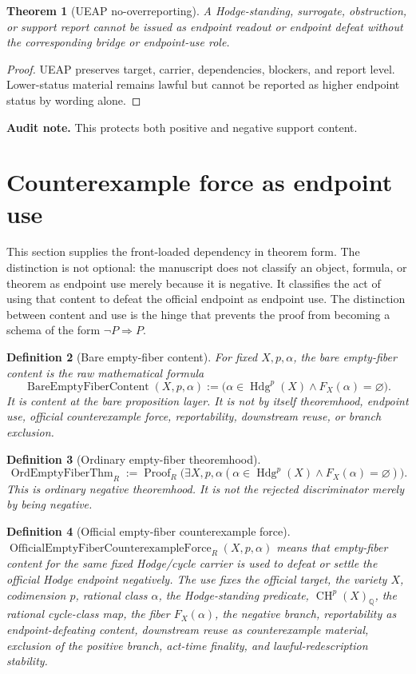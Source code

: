 \documentclass[11pt]{article}
\newtheorem{theorem}{Theorem}[section]
\newtheorem{definition}[theorem]{Definition}
\newcommand{\QQ}{\mathbb{Q}}
\newcommand{\CH}{\operatorname{CH}}
\newcommand{\Hdg}{\operatorname{Hdg}}
\begin{document}
\begin{theorem}[UEAP no-overreporting]
A Hodge-standing, surrogate, obstruction, or support report cannot be issued as endpoint readout or endpoint defeat without the corresponding bridge or endpoint-use role.
\end{theorem}
\begin{proof}
UEAP preserves target, carrier, dependencies, blockers, and report level. Lower-status material remains lawful but cannot be reported as higher endpoint status by wording alone.
\end{proof}
\par\noindent\textbf{Audit note.} This protects both positive and negative support content.


\section{Counterexample force as endpoint use}

This section supplies the front-loaded dependency in theorem form.  The distinction is not optional: the manuscript does not classify an object, formula, or theorem as endpoint use merely because it is negative.  It classifies the act of using that content to defeat the official endpoint as endpoint use.  The distinction between content and use is the hinge that prevents the proof from becoming a schema of the form $\neg P\Rightarrow P$.

\begin{definition}[Bare empty-fiber content]
For fixed $X,p,\alpha$, the bare empty-fiber content is the raw mathematical formula
\[
\operatorname{BareEmptyFiberContent}(X,p,\alpha)
:=\bigl(\alpha\in\Hdg^p(X)\wedge F_X(\alpha)=\varnothing\bigr).
\]
It is content at the bare proposition layer.  It is not by itself theoremhood, endpoint use, official counterexample force, reportability, downstream reuse, or branch exclusion.
\end{definition}

\begin{definition}[Ordinary empty-fiber theoremhood]
\[
\operatorname{OrdEmptyFiberThm}_R:=\operatorname{Proof}_R\bigl(\exists X,p,\alpha(\alpha\in\Hdg^p(X)\wedge F_X(\alpha)=\varnothing)\bigr).
\]
This is ordinary negative theoremhood.  It is not the rejected discriminator merely by being negative.
\end{definition}

\begin{definition}[Official empty-fiber counterexample force]
$\operatorname{OfficialEmptyFiberCounterexampleForce}_R(X,p,\alpha)$ means that empty-fiber content for the same fixed Hodge/cycle carrier is used to defeat or settle the official Hodge endpoint negatively.  The use fixes the official target, the variety $X$, codimension $p$, rational class $\alpha$, the Hodge-standing predicate, $\CH^p(X)_\QQ$, the rational cycle-class map, the fiber $F_X(\alpha)$, the negative branch, reportability as endpoint-defeating content, downstream reuse as counterexample material, exclusion of the positive branch, act-time finality, and lawful-redescription stability.
\end{definition}
\end{document}
